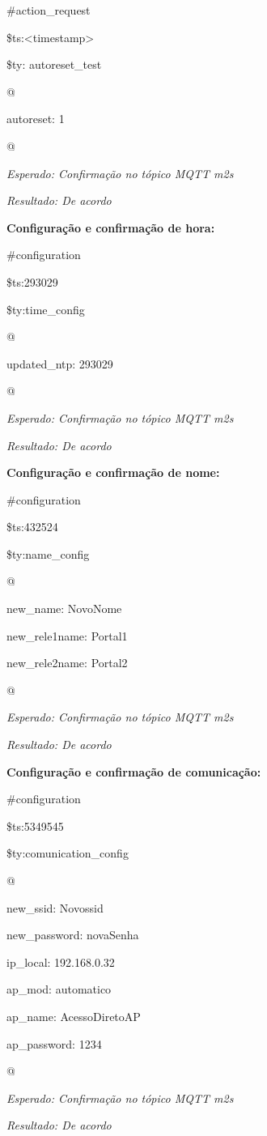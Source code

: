 \#action\_request

\$ts:\textless timestamp\textgreater

\$ty: autoreset\_test

@

autoreset: 1

@

\textit{Esperado: Confirmação no tópico MQTT m2s}

\textit{Resultado: De acordo}

\textbf{Configuração e confirmação de hora:}

\#configuration

\$ts:293029

\$ty:time\_config

@

updated\_ntp: 293029

@

\textit{Esperado: Confirmação no tópico MQTT m2s}

\textit{Resultado: De acordo}

\textbf{Configuração e confirmação de nome:}

\#configuration

\$ts:432524

\$ty:name\_config

@

new\_name: NovoNome

new\_rele1name: Portal1

new\_rele2name: Portal2

@

\textit{Esperado: Confirmação no tópico MQTT m2s}

\textit{Resultado: De acordo}

\textbf{Configuração e confirmação de comunicação:}

\#configuration

\$ts:5349545

\$ty:comunication\_config

@

new\_ssid: Novossid

new\_password: novaSenha

ip\_local: 192.168.0.32

ap\_mod: automatico

ap\_name: AcessoDiretoAP

ap\_password: 1234

@

\textit{Esperado: Confirmação no tópico MQTT m2s}

\textit{Resultado: De acordo}

